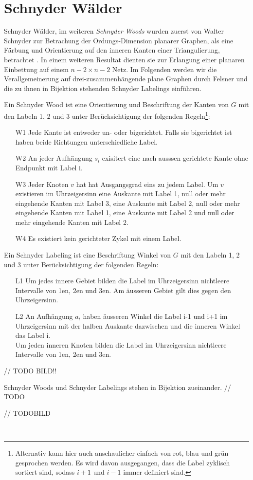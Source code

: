 \section{Schnyder Wälder}\label{sw}
Schnyder Wälder, im weiteren \textit{Schnyder Woods} wurden zuerst von Walter Schnyder zur Betrachung der Ordungs-Dimension planarer Graphen, als eine Färbung und Orientierung auf den inneren Kanten einer Triangulierung, betrachtet \cite{schnyder89}. In einem weiteren Resultat dienten sie zur Erlangung einer planaren Einbettung auf einem $n-2 \times n-2$ Netz\cite{schnyder90}. Im Folgenden werden wir die Verallgemeinerung auf drei-zusammenhängende plane Graphen durch Felsner \cite{felsner01} und die zu ihnen in Bijektion stehenden Schnyder Labelings einführen.\\
\begin{definition}
Ein Schnyder Wood ist eine Orientierung und Beschriftung der Kanten von $G$ mit den Labeln 1, 2 und 3 unter Berücksichtigung der folgenden Regeln\footnote{Alternativ kann hier auch anschaulicher einfach von rot, blau und grün gesprochen werden. Es wird davon ausgegangen, dass die Label zyklisch sortiert sind, sodass $i+1$ und $i-1$ immer definiert sind.}:
\begin{itemize}
\item[W1] Jede Kante ist entweder un- oder bigerichtet. Falls sie bigerichtet ist haben beide Richtungen unterschiedliche Label.
\item[W2] An jeder Aufhängung  $s_i$ exisitert eine nach ausssen gerichtete Kante ohne Endpunkt mit Label i.  
\item[W3] Jeder Knoten $v$ hat hat Ausgangsgrad eins zu jedem Label. Um $v$ existieren im Uhrzeigersinn eine Auskante mit Label 1, null oder mehr eingehende Kanten mit Label 3, eine Auskante mit Label 2, null oder mehr  eingehende Kanten mit Label 1, eine Auskante mit Label 2 und null oder mehr  eingehende Kanten mit Label 2.
\item[W4] Es existiert kein gerichteter Zykel mit einem Label.
\end{itemize}

\end{definition}

\begin{definition}
Ein Schnyder Labeling ist eine Beschriftung Winkel von $G$ mit den Labeln 1, 2 und 3 unter Berücksichtigung der folgenden Regeln:
\begin{itemize}
\item[L1] Um jedes innere Gebiet bilden die Label im Uhrzeigersinn nichtleere Intervalle von 1en, 2en und 3en. Am äusseren Gebiet gilt dies gegen den Uhrzeigersinn.
\item[L2] An Aufhängung $a_i$ haben äusseren Winkel die Label i-1 und i+1 im Uhrzeigersinn mit der halben Auskante dazwischen und die inneren Winkel das Label i.\\
Um jeden inneren Knoten bilden die Label im Uhrzeigersinn nichtleere Intervalle von 1en, 2en und 3en.
\end{itemize} 

\end{definition}

// TODO BILD!!

\begin{theorem}
Schnyder Woods und Schnyder Labelings stehen in Bijektion zueinander.
// TODO  
\end{theorem}

// TODOBILD

\